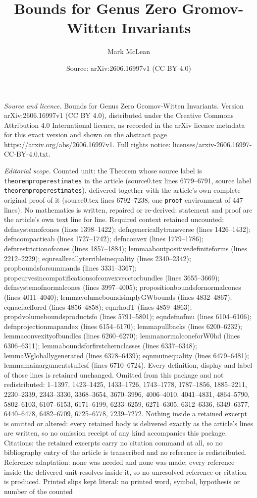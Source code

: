 \documentclass[10pt,a4paper]{amsart}
\title[Bounds for Genus Zero Gromov-Witten Invariants]{Bounds for Genus Zero Gromov-Witten Invariants}
\author{Mark McLean}
\date{Source: arXiv:2606.16997v1 (CC BY 4.0)}
\begin{document}
\maketitle

\noindent\emph{Source and licence.} Bounds for Genus Zero Gromov-Witten Invariants. Version arXiv:2606.16997v1 (CC BY 4.0), distributed under the Creative Commons Attribution 4.0 International licence, as recorded in the arXiv licence metadata for this exact version and shown on the abstract page https://arxiv.org/abs/2606.16997v1. Full rights notice: licenses/arxiv-2606.16997-CC-BY-4.0.txt.\par\smallskip

\noindent\textit{Editorial scope.} Counted unit: the Theorem whose source label is \texttt{theoremproperestimates} in the article (source0.tex lines 6779--6791, source label \texttt{theoremproperestimates}), delivered together with the article's own complete original proof of it (source0.tex lines 6792--7238, one \texttt{proof} environment of 447 lines). No mathematics is written, repaired or re-derived: statement and proof are the article's own text line for line. Required context retained uncounted: defnsystemofcones (lines 1398--1422); defngenericallytransverse (lines 1426--1432); defncompactieab (lines 1727--1742); defnconvex (lines 1779--1786); defnrestrictionofcones (lines 1857--1884); lemmaaboutpositivedefiniteforms (lines 2212--2229); eqnreallreallyterribleinequality (lines 2340--2342); propboundsforsummands (lines 3331--3367); propcurvesincompatificationsofconvexvecctorbundles (lines 3655--3669); defnsystemofnormalcones (lines 3997--4005); propositionboundsfornormalcones (lines 4011--4040); lemmavolumeboundsimplyGWbounds (lines 4832--4867); eqnaefaefforrd (lines 4856--4858); eqnrhodT (lines 4859--4863); propdvolumeboundsproductsfo (lines 5791--5801); eqndefnofmu (lines 6104--6106); defnprojectionmapandex (lines 6154--6170); lemmapullbacks (lines 6200--6232); lemmaconvexityofbundles (lines 6260--6270); lemmanormalconeforW0hd (lines 6306--6311); lemmaboundsforfirstchernclasses (lines 6337--6348); lemmaWgloballygenerated (lines 6378--6439); eqnmuinequality (lines 6479--6481); lemmamainargumentstuffesf (lines 6710--6724). Every definition, display and label of those lines is retained unchanged. Omitted from this package and not redistributed: 1--1397, 1423--1425, 1433--1726, 1743--1778, 1787--1856, 1885--2211, 2230--2339, 2343--3330, 3368--3654, 3670--3996, 4006--4010, 4041--4831, 4864--5790, 5802--6103, 6107--6153, 6171--6199, 6233--6259, 6271--6305, 6312--6336, 6349--6377, 6440--6478, 6482--6709, 6725--6778, 7239--7272. Nothing inside a retained excerpt is omitted or altered: every retained body is delivered exactly as the article's lines are written, so no omission receipt of any kind accompanies this package. Citations: the retained excerpts carry no citation command at all, so no bibliography entry of the article is transcribed and no reference is redistributed. Reference adaptation: none was needed and none was made; every reference inside the delivered unit resolves inside it, so no unresolved reference or citation is produced. Printed slips kept literal: no printed word, symbol, hypothesis or number of the counted 
\end{document}
